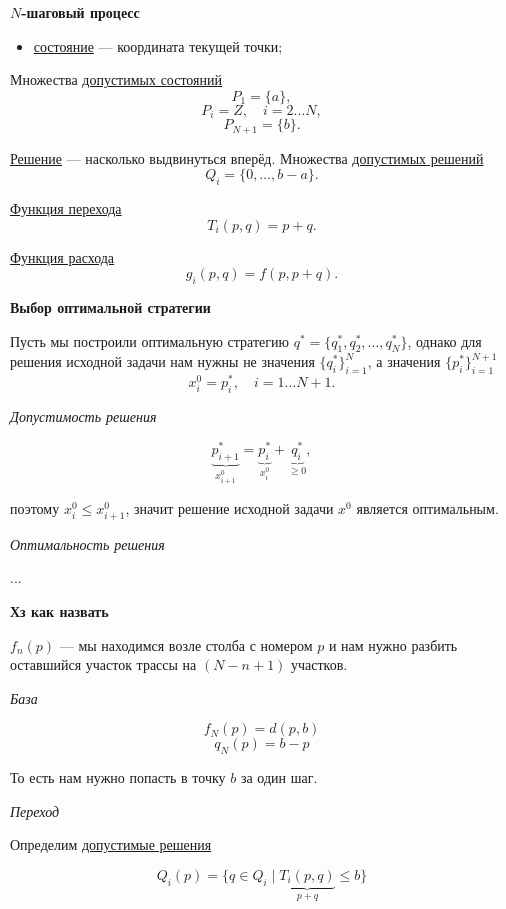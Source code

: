 \textbf{$N$-шаговый процесс}

\begin{itemize}[nosep]
	\item \underline{состояние} --- координата текущей точки;
\end{itemize}

Множества \underline{допустимых состояний}
\[
P_1 = \{a\},
\]
\[
P_i = Z, \quad i = 2 \dots N,
\]
\[
P_{N+1} = \{b\}.
\]

\underline{Решение} --- насколько выдвинуться вперёд. Множества \underline{допустимых решений}
\[
Q_i = \{0, \dots, b-a\}.
\]

\underline{Функция перехода}
\[
T_i(p, q) = p + q.
\]

\underline{Функция расхода}
\[
g_i(p, q) = f(p, p + q).
\]

\textbf{Выбор оптимальной стратегии}

Пусть мы построили оптимальную стратегию $q^* = \{q_1^*, q_2^*, \dots, q_N^*\}$, однако для решения исходной задачи нам нужны не значения $\{q_i^*\}_{i=1}^N$, а значения $\{p_i^*\}_{i=1}^{N+1}$
\[
x_i^0 = p_i^*, \quad i = 1 \dots N+1.
\]

\bigskip

\textit{Допустимость решения}

\[
\underbrace{p_{i+1}^*}_{x_{i+1}^0} = \underbrace{p_i^*}_{x_i^0} + \underbrace{q_i^*}_{\ge 0},
\]

поэтому $x_i^0 \le x_{i+1}^0$, значит решение исходной задачи $x^0$ является оптимальным.

\bigskip

\textit{Оптимальность решения}

...

\bigskip

\textbf{Хз как назвать}

$f_n(p)$ --- мы находимся возле столба с номером $p$ и нам нужно разбить оставшийся участок трассы на $(N - n + 1)$ участков.

\bigskip

\textit{База}

\[
f_N(p) = d(p, b)
\]
\[
q_N(p) = b - p
\]

То есть нам нужно попасть в точку $b$ за один шаг.

\bigskip

\textit{Переход}

Определим \underline{допустимые решения}

\[
Q_i(p) = \{q \in Q_i \; \big| \; \underbrace{T_i(p, q)}_{p+q} \le b\}
\]

